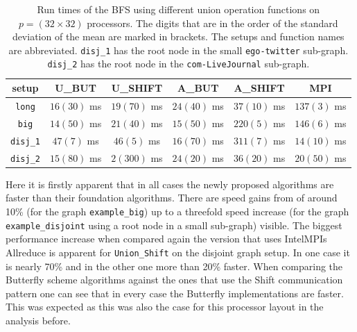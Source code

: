 \begin{table}[h]
	\centering
	\begin{tabular}{|c|| c| c |c| c | c|} \hline
		setup & U\_BUT   & U\_SHIFT & A\_BUT & A\_SHIFT & MPI\\
		\hline \hline
		\texttt{long} & $16(30)$  ms & $19(70)$  ms & $24(40)$  ms & $37(10)$  ms & $137(3)$  ms \\ \hline
		\texttt{big} & $14(50)$  ms  & $21(40)$  ms & $15(50)$  ms  & $220(5)$  ms & $146(6)$  ms \\ \hline
		\texttt{disj\_1} & $47(7)$  ms\hspace{1ex}   &  $46(5)$  ms\hspace{1ex} &   $16(70)$  ms   &    $311(7)$  ms &  $14(10)$  ms \\ \hline
		\texttt{disj\_2} & $15(80) $  ms &  $2(300) $  ms &  $24(20) $  ms &  $36(20) $  ms & $20(50) $  ms \\ \hline
	\end{tabular}
	\caption{Run times of the BFS using different union operation functions on $p=(32\times32)$ processors. The digits that are in the order of the standard deviation of the mean are marked in brackets. The setups and function names are abbreviated. \texttt{disj\_1} has the root node in the small \texttt{ego-twitter} sub-graph. \texttt{disj\_2} has the root node in the \texttt{com-LiveJournal} sub-graph.}
	\label{table:32x32BFS}
\end{table}
Here it is firstly apparent that in all cases the newly proposed algorithms are faster than their foundation algorithms. There are speed gains from of around 10\% (for the graph \texttt{example\_big}) up to a threefold speed increase (for the graph \texttt{example\_disjoint} using a root node in a small sub-graph) visible. The biggest performance increase when compared again the version that uses IntelMPIs Allreduce is apparent for \texttt{Union\_Shift} on the disjoint graph setup. In one case it is nearly 70\% and in the other one more than 20\% faster.  When comparing the Butterfly scheme algorithms against the ones that use the Shift  communication pattern one can see that in every case the Butterfly implementations are faster. This was expected as this was also the case for this processor layout in the analysis before.\\

